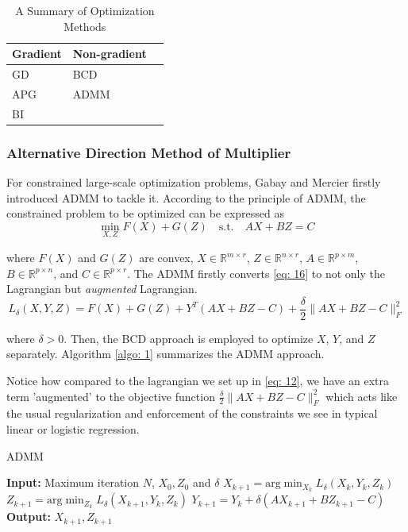 \begin{table}[htbp]
\centering
\caption{A Summary of Optimization Methods}
\label{tab:optimization}
\begin{tabular}{@{}lll@{}}
\toprule
\multicolumn{1}{c}{\textbf{Gradient}} & \multicolumn{1}{c}{\textbf{Non-gradient}} \\ \midrule
GD &  BCD\\
APG  &ADMM  \\
BI  &  \\ \bottomrule
\end{tabular}
\end{table}

\subsubsection{Alternative Direction Method of Multiplier}

For constrained large-scale optimization problems, Gabay and Mercier \cite{ADMM} firstly introduced ADMM to tackle it.  According to the principle of ADMM, the constrained problem to be optimized can be expressed as
\begin{equation}
    \min_{X,Z} F(X) + G(Z) \quad \text{s.t.} \quad AX + BZ = C
    \label{eq: 16}
\end{equation}

where $F(X)$ and $G(Z)$ are convex, $X \in \mathbb{R}^{m \times r}$, $Z \in \mathbb{R}^{n \times r}$, $A \in \mathbb{R}^{p \times m}$, $B \in \mathbb{R}^{p \times n}$, and $C \in \mathbb{R}^{p \times r}$. The ADMM firstly converts \ref{eq: 16} to not only the Lagrangian but \textit{augmented} Lagrangian. 
\[
L_{\delta}(X, Y, Z) = F(X) + G(Z) + Y^T (AX + BZ - C) + \frac{\delta}{2} \|AX + BZ - C\|_F^2
\]

where $\delta > 0$. Then, the BCD approach is employed to optimize $X$, $Y$, and $Z$ separately. Algorithm \ref{algo: 1} summarizes the ADMM approach.

Notice how compared to the lagrangian we set up in \ref{eq: 12}, we have an extra term 'augmented' to the objective function $\frac{\delta}{2} \|AX + BZ - C\|_F^2$ which acts like the usual regularization and enforcement of the constraints we see in typical linear or logistic regression. 

\begin{algorithm}
  \caption{ADMM}
  \begin{algorithmic}[1]
    \State \textbf{Input:} Maximum iteration $N$, $X_0, Z_0$ and $\delta$
      \State $X_{k+1} = \text{arg} \min_{X_k} L_{\delta}(X_k, Y_k, Z_k)$
      \State $Z_{k+1} = \text{arg} \min_{Z_k} L_{\delta}(X_{k+1}, Y_k, Z_k)$
      \State $Y_{k+1} = Y_k + \delta(AX_{k+1} + BZ_{k+1} - C)$
    \EndFor
    \State \textbf{Output:} $X_{k+1}, Z_{k+1}$
  \end{algorithmic}
  \label{algo: 1}
\end{algorithm}

